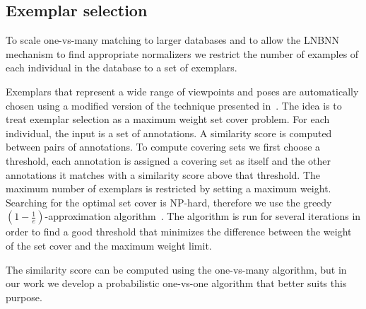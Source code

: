 


\subsection{Exemplar selection}\label{sec:exempselect}
    To scale one-vs-many matching to larger databases and to allow the LNBNN
    mechanism to find appropriate normalizers we restrict the number of
    examples of each individual in the database to a set of exemplars.

    Exemplars that represent a wide range of viewpoints and poses are
      automatically chosen using a modified version of the technique presented
      in~\cite{oddone_mobile_2016}.
    The idea is to treat exemplar selection as a maximum weight set cover
      problem.
    For each individual, the input is a set of annotations.
    A similarity score is computed between pairs of annotations.
    To compute covering sets we first choose a threshold, each annotation is
      assigned a covering set as itself and the other annotations it matches
      with a similarity score above that threshold.
    The maximum number of exemplars is restricted by setting a maximum weight.
    Searching for the optimal set cover is NP-hard, therefore we use the
      greedy %
    $(1 - \frac{1}{e})$-approximation algorithm~\cite{michael_guide_1979}.
    The algorithm is run for several iterations in order to find a good
      threshold that minimizes the difference between the weight of the set
      cover and the maximum weight limit.

    The similarity score can be computed using the one-vs-many algorithm, but
      in our work we develop a probabilistic one-vs-one algorithm that better
      suits this purpose.
 
